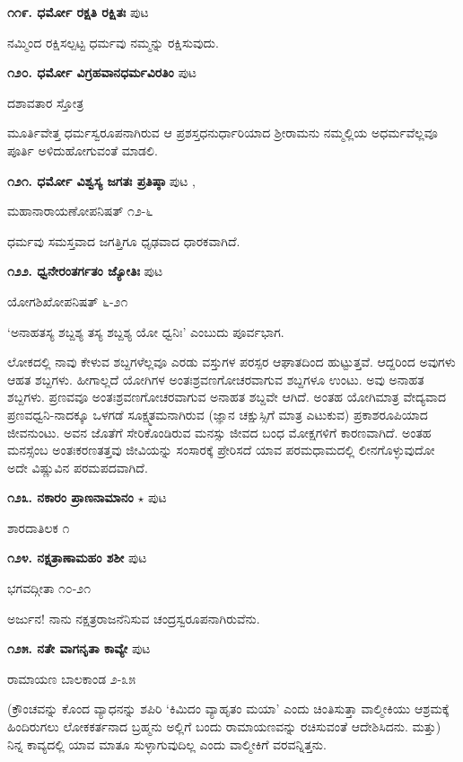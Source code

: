 \medskip
\noindent\textbf{೧೧೯. ಧರ್ಮೋ ರಕ್ಷತಿ ರಕ್ಷಿತಃ} \hfill ಪುಟ \pageref{225}

ನಮ್ಮಿಂದ ರಕ್ಷಿಸಲ್ಪಟ್ಟ ಧರ್ಮವು ನಮ್ಮನ್ನು ರಕ್ಷಿಸುವುದು.

\medskip
\noindent\textbf{೧೨೦. ಧರ್ಮೋ ವಿಗ್ರಹವಾನಧರ್ಮವಿರತಿಂ} \hfill ಪುಟ \pageref{138}

\hfill ದಶಾವತಾರ ಸ್ತೋತ್ರ

ಮೂರ್ತಿವೇತ್ತ ಧರ್ಮಸ್ವರೂಪನಾಗಿರುವ ಆ ಪ್ರಶಸ್ತಧನುರ್ಧಾರಿಯಾದ ಶ್ರೀರಾಮನು ನಮ್ಮಲ್ಲಿಯ ಅಧರ್ಮವೆಲ್ಲವೂ ಪೂರ್ತಿ ಅಳಿದುಹೋಗುವಂತೆ ಮಾಡಲಿ.

\medskip
\noindent\textbf{೧೨೧. ಧರ್ಮೋ ವಿಶ್ವಸ್ಯ ಜಗತಃ ಪ್ರತಿಷ್ಠಾ} \hfill ಪುಟ \pageref{182},\pageref{207b}

\hfill ಮಹಾನಾರಾಯಣೋಪನಿಷತ್ ೧೨-೬

ಧರ್ಮವು ಸಮಸ್ತವಾದ ಜಗತ್ತಿಗೂ ಧೃಢವಾದ ಧಾರಕವಾಗಿದೆ.

\medskip
\noindent\textbf{೧೨೨. ಧ್ವನೇರಂತರ್ಗತಂ  ಜ್ಯೋತಿಃ} \hfill ಪುಟ \pageref{87}

\hfill ಯೋಗಶಿಖೋಪನಿಷತ್ ೬-೨೧

`ಅನಾಹತಸ್ಯ ಶಬ್ದಶ್ಯ ತಸ್ಯ ಶಬ್ದಶ್ಯ ಯೋ ಧ್ವನಿಃ'  ಎಂಬುದು ಪೂರ್ವಭಾಗ.

ಲೋಕದಲ್ಲಿ ನಾವು ಕೇಳುವ ಶಬ್ದಗಳೆಲ್ಲವೂ ಎರಡು ವಸ್ತುಗಳ ಪರಸ್ಪರ ಆಘಾತದಿಂದ ಹುಟ್ಟುತ್ತವೆ. ಆದ್ದರಿಂದ ಅವುಗಳು ಆಹತ ಶಬ್ದಗಳು. ಹೀಗಾಲ್ಲದೆ ಯೋಗಿಗಳ ಅಂತಃಶ್ರವಣಗೋಚರವಾಗುವ ಶಬ್ದಗಳೂ ಉಂಟು. ಅವು ಅನಾಹತ ಶಬ್ದಗಳು. ಪ್ರಣವವೂ ಅಂತಃಶ್ರವಣಗೋಚರವಾಗುವ ಅನಾಹತ ಶಬ್ದವೇ ಆಗಿದೆ. ಅಂತಹ ಯೋಗಿಮಾತ್ರ ವೇದ್ಯವಾದ ಪ್ರಣವಧ್ವನಿ-ನಾದಕ್ಕೂ ಒಳಗಡೆ ಸೂಕ್ಷ್ಮತಮನಾಗಿರುವ (ಜ್ಞಾನ ಚಕ್ಷುಸ್ಸಿಗೆ ಮಾತ್ರ ಎಟುಕುವ) ಪ್ರಕಾಶರೂಪಿಯಾದ ಜೀವನುಂಟು. ಅವನ ಜೊತೆಗೆ ಸೇರಿಕೊಂಡಿರುವ ಮನಸ್ಸು ಜೀವದ ಬಂಧ ಮೋಕ್ಷಗಳಿಗೆ ಕಾರಣವಾಗಿದೆ. ಅಂತಹ ಮನಸ್ಸೆಂಬ ಅಂತಃಕರಣತತ್ತವು ಜೀವಿಯನ್ನು ಸಂಸಾರಕ್ಕೆ ಪ್ರೇರಿಸದೆ ಯಾವ ಪರಮಧಾಮದಲ್ಲಿ ಲೀನಗೊಳ್ಳುವುದೋ ಅದೇ ವಿಷ್ಣುವಿನ ಪರಮಪದವಾಗಿದೆ.

\medskip
\noindent\textbf{೧೨೩. ನಕಾರಂ ಪ್ರಾಣನಾಮಾನಂ} $\star$ \hfill ಪುಟ \pageref{17}

\hfill ಶಾರದಾತಿಲಕ ೧

\medskip
\noindent\textbf{೧೨೪. ನಕ್ಷತ್ರಾಣಾಮಹಂ ಶಶೀ} \hfill ಪುಟ \pageref{98}

\hfill ಭಗವದ್ಗೀತಾ ೧೦-೨೧

ಅರ್ಜುನ! ನಾನು ನಕ್ಷತ್ರರಾಜನೆನಿಸುವ ಚಂದ್ರಸ್ವರೂಪನಾಗಿರುವೆನು.

\medskip
\noindent\textbf{೧೨೫. ನತೇ ವಾಗನೃತಾ ಕಾವ್ಯೇ} \hfill ಪುಟ \pageref{209}

\hfill ರಾಮಾಯಣ ಬಾಲಕಾಂಡ ೨-೩೫

(ಕ್ರೌಂಚವನ್ನು ಕೊಂದ ವ್ಯಾಧನನ್ನು ಶಪಿರಿ `ಕಿಮಿದಂ ವ್ಯಾಹೃತಂ ಮಯಾ' ಎಂದು ಚಿಂತಿಸುತ್ತಾ ವಾಲ್ಮೀಕಿಯು ಆಶ್ರಮಕ್ಕೆ ಹಿಂದಿರುಗಲು ಲೋಕಕರ್ತನಾದ ಬ್ರಹ್ಮನು ಅಲ್ಲಿಗೆ ಬಂದು ರಾಮಾಯಣವನ್ನು ರಚಿಸುವಂತೆ ಆದೇಶಿಸಿದನು. ಮತ್ತು) ನಿನ್ನ ಕಾವ್ಯದಲ್ಲಿ ಯಾವ ಮಾತೂ ಸುಳ್ಳಾಗುವುದಿಲ್ಲ ಎಂದು ವಾಲ್ಮೀಕಿಗೆ ವರವನ್ನಿತ್ತನು.

